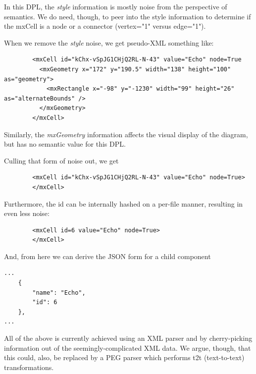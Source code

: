 \documentclass[10pt,anonymous,review]{acmart}
\begin{document}
In this DPL, the \emph{style} information is mostly noise from the perspective of semantics. We do need, though, to peer into the style information to determine if the mxCell is a node or a connector (vertex="1" versus edge="1").

When we remove the \emph{style} noise, we get pseudo-XML something like:
\begin{verbatim}
        <mxCell id="kChx-vSpJG1CHjQ2RL-N-43" value="Echo" node=True
          <mxGeometry x="172" y="190.5" width="138" height="100" as="geometry">
            <mxRectangle x="-98" y="-1230" width="99" height="26" as="alternateBounds" />
          </mxGeometry>
        </mxCell>
\end{verbatim}
Similarly, the \emph{mxGeometry} information affects the visual display of the diagram, but has no semantic value for this DPL.

Culling that form of noise out, we get
\begin{verbatim}
        <mxCell id="kChx-vSpJG1CHjQ2RL-N-43" value="Echo" node=True>
        </mxCell>
\end{verbatim}
Furthermore, the id can be internally hashed on a per-file manner, resulting in even less noise:
\begin{verbatim}
        <mxCell id=6 value="Echo" node=True>
        </mxCell>
\end{verbatim}
And, from here we can derive the JSON form for a child component
\begin{verbatim}
...
    {
        "name": "Echo",
        "id": 6
    },
...
\end{verbatim}
All of the above is currently achieved using an XML parser and by cherry-picking information out of
the seemingly-complicated XML data. We argue, though, that this could, also, be replaced
by a PEG parser which performs t2t (text-to-text) transformations.
\end{document}
